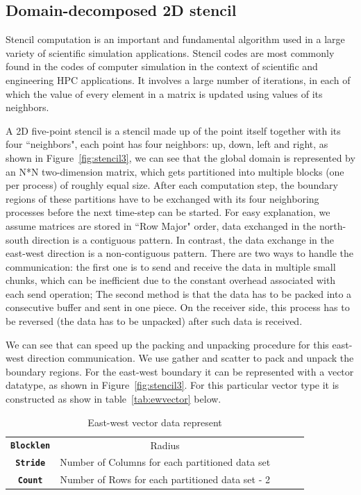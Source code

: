 \documentclass[conference]{IEEEtran}
\begin{document}
\subsection{Domain-decomposed 2D stencil}\label{sec:stencil}
Stencil computation is an important and fundamental algorithm
used in a large variety of scientific simulation applications.
Stencil codes are most commonly found in the codes of computer
simulation in the context of scientific and engineering HPC applications.
It involves a large number of iterations,
in each of which the value of every element in a matrix is
updated using values of its neighbors.

A 2D five-point stencil is a stencil made up of the point itself
together with its four ``neighbors", each point has four neighbors: up, down,
left and right, as shown in Figure~\ref{fig:stencil3}, we can see that the global
domain is represented by an N*N two-dimension matrix,
which gets partitioned into multiple blocks (one per process) of roughly equal size.
After each computation step, the boundary regions of
these partitions have to be exchanged with its four neighboring processes
before the next time-step can be started.
For easy explanation, we assume matrices are stored in ``Row Major" order,
data exchanged in the north-south direction is a contiguous pattern.
In contrast, the data exchange in the east-west direction is a non-contiguous pattern.
There are two ways to handle the communication: the first one is to send and receive the
data in multiple small chunks, which can be inefficient due to the constant overhead associated
with each send operation; The second method is that the data has to be
packed into a consecutive buffer and sent in one piece. On the receiver side,
this process has to be reversed (the data has to be
unpacked) after such data is received.

We can see that \ourwork can speed up the packing and unpacking procedure for this east-west
direction communication. We use gather and scatter to pack and unpack the boundary regions.
For the east-west boundary it can be represented with a vector datatype, as shown in Figure~\ref{fig:stencil3}.
For this particular vector type it is constructed as show in table~\ref{tab:ewvector} below.
\begin{table}
  \centering
  \caption{East-west vector data represent}\label{tab:ewvector}
  \label{tab:parameters1}
  \small
  \begin{tabular}{cclll}
    \toprule
    \midrule
      \texttt{\bf Blocklen} & Radius \\
      \texttt{\bf Stride} & Number of Columns for each partitioned data set \\
      \texttt{\bf Count} & Number of Rows for each partitioned data set - 2 \\
      \bottomrule
  \end{tabular}
\end{table}
\end{document}
